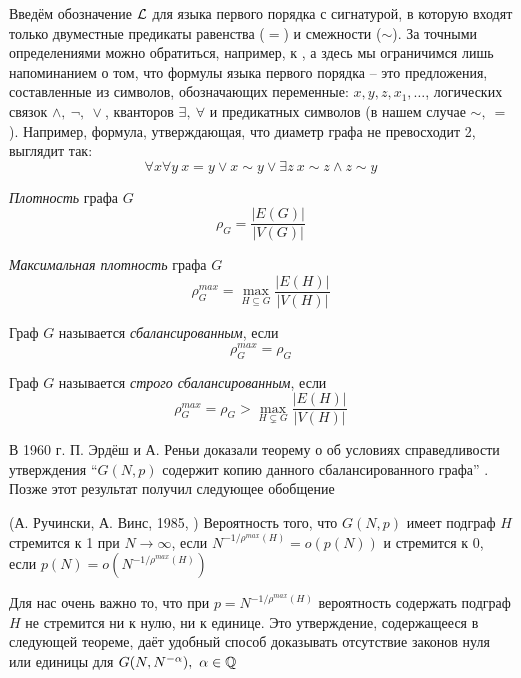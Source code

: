 \documentclass{mipt-thesis-bs}
\begin{document}
    Введём обозначение $\mathcal{L}$ для языка первого порядка с сигнатурой, в которую входят только двуместные предикаты равенства ($=$) и смежности ($\sim$).
    За точными определениями можно обратиться, например, к
    \cite{shen}, а здесь мы ограничимся лишь напоминанием о том, что формулы языка первого порядка -- это предложения, составленные из символов, обозначающих переменные: 
    $x,y,z,x_1,\ldots$, 
    логических связок 
    $\wedge, ~\neg, ~\vee$, 
    кванторов 
    $\exists, ~\forall$ и 
    предикатных символов (в нашем случае
    $\sim, ~ =$).
    Например, формула, утверждающая, что диаметр графа не превосходит 2, выглядит так:
    \[
    \forall x \forall y ~ x=y \vee x\sim y \vee \exists z ~ x \sim z \wedge z \sim y
    \]
    
    \Def \textit{Плотность} графа $G$ 
   \[ \rho_G = \frac {|E(G)|}{|V(G)|} \]
   
   \Def \textit{Максимальная плотность} графа $G$
     \[ \rho^{max}_G = \max_{H \subseteq G} \frac {|E(H)|}{|V(H)|} \]
    
    \Def Граф $G$ называется \textit{сбалансированным}, если 
    \[ \rho^{max}_G = \rho_G \]
    
    \Def Граф $G$ называется \textit{строго сбалансированным}, если 
    \[\rho^{max}_G = \rho_G > \max_{H \subsetneq G} \frac {|E(H)|}{|V(H)|} \]
     
В 1960 г. П. Эрдёш и А. Реньи
доказали теорему о об условиях справедливости утверждения “$G(N, p)$ содержит копию данного сбалансированного графа” \cite{erdHos1976evolution}. 
Позже этот результат получил следующее обобщение
    
\begin{theorem} (А. Ручински, А. Винс, 1985, \cite{rucinski1985balanced}) Вероятность того, что $G(N, p)$ имеет подграф $H$ стремится к 1 при $N \rightarrow \infty$, если $N^{-1/\rho^{max}(H)} = o(p(N))$ и стремится к  0, если $p(N) = o\left(N^{-1/\rho^{max}(H)}\right)$

\end{theorem}

Для нас очень важно то, что при $p = N^{-1/\rho^{max}(H)}$ вероятность содержать подграф $H$ не стремится ни к нулю, ни к единице.
Это утверждение, содержащееся в следующей теореме, даёт удобный способ доказывать отсутствие законов нуля или единицы для $G(N, N^{-\alpha}), ~\alpha \in \mathbb {Q}$
\end{document}
